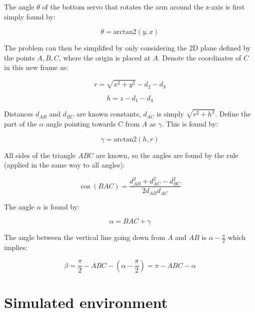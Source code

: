 The angle $\theta$ of the bottom servo that rotates the arm around the z-axis
is first simply found by:

\begin{equation}
    \theta = \text{arctan2}(y, x)
\end{equation}

The problem can then be simplified by only considering the 2D plane defined by
the points $A, B, C$, where the origin is placed at $A$.  Denote the
coordinates of $C$ in this new frame as:

\begin{equation}
    r = \sqrt{x^2 + y^2} - d_2 - d_3
\end{equation}

\begin{equation}
    h = z - d_1 - d_4
\end{equation}

Distances $d_{AB}$ and $d_{BC}$ are known constants, $d_{AC}$ is simply
$\sqrt{r^2 + h^2}$. Define the part of the $\alpha$ angle pointing towards
$C$ from $A$ as $\gamma$. This is found by:

\begin{equation}
    \gamma = \text{arctan2}(h, r)
\end{equation}

All sides of the triangle $ABC$ are known, so the angles are found by the rule (applied in the same way to all angles):

\begin{equation}
    \cos(BAC) = \frac{d_{AB}^2 + d_{AC}^2 - d_{BC}^2}{2 d_{AB} d_{AC}}
\end{equation}

The angle $\alpha$ is found by:

\begin{equation}
    \alpha = BAC + \gamma
\end{equation}

The angle between the vertical line going down from $A$ and $AB$ is $\alpha - \frac{\pi}{2}$
which implies:

\begin{equation}
    \beta = \frac{\pi}{2} - ABC - (\alpha - \frac{\pi}{2}) = \pi - ABC - \alpha
\end{equation}

\section{Simulated environment}
\label{sec:method_simulated}

